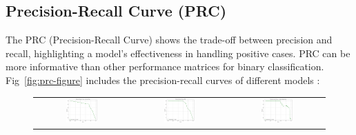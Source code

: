 \documentclass[pt]{article}  %
\begin{document}
\subsection{Precision-Recall Curve (PRC)}
The PRC (Precision-Recall Curve) shows the trade-off between precision and recall, highlighting a model's effectiveness in handling positive cases. PRC can be more informative than other performance matrices for binary classification\cite{ref13}. Fig~\ref{fig:prc-figure} includes the precision-recall curves of different models :

\begin{figure}[H]
\begin{center}
\begin{tabular}{c c c} %
    \includegraphics[width=0.35\textwidth]{prc-curve/decision.png} & 
    \includegraphics[width=0.35\textwidth]{prc-curve/knn.png} &
    \includegraphics[width=0.35\textwidth]{prc-curve/logistic.png} \\
\end{tabular}

\vspace{5pt} %


\end{center}
\end{figure}
\end{document}
